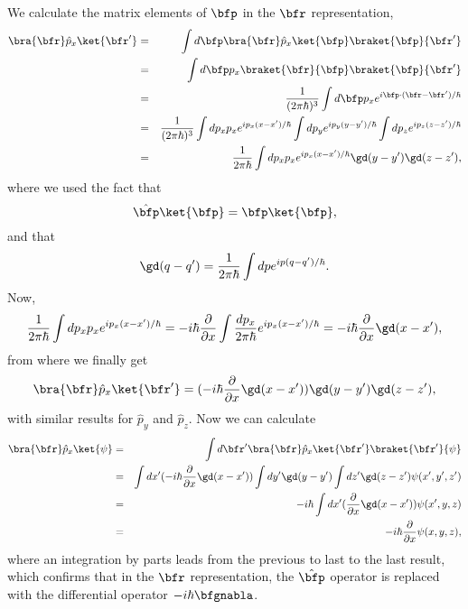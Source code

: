We calculate the matrix elements of $\bfp$ in the $\bfr$
representation,
\begin{eqnarray}\label{ap_matp}
\bra{\bfr}\hat{p}_x\ket{\bfr'}&=&
\int d\bfp
\bra{\bfr}\hat{p}_x\ket{\bfp}\braket{\bfp}{\bfr'} \\ \nonumber
&=&
\int d\bfp
p_x\braket{\bfr}{\bfp}\braket{\bfp}{\bfr'} \\ \nonumber
&=&
\frac{1}{(2\pi\hbar)^3}
\int d\bfp
p_x
e^{i\bfp\cdot(\bfr-\bfr')/\hbar}
\\ \nonumber
&=&
\frac{1}{(2\pi\hbar)^3}
\int dp_x
p_x
e^{ip_x(x-x')/\hbar}
\int dp_y
e^{ip_y(y-y')/\hbar}
\int dp_z
e^{ip_z(z-z')/\hbar}
\\ \nonumber
&=&
\frac{1}{2\pi\hbar}
\int dp_x
p_x
e^{ip_x(x-x')/\hbar}
\gd(y-y')
\gd(z-z')
,
\end{eqnarray}
where we used the fact that
\begin{equation}\label{ap_otra}
\hat\bfp\ket{\bfp}=\bfp\ket{\bfp}
,
\end{equation}
and that
\begin{equation}\label{ap_delta}
\gd(q-q')=\frac{1}{2\pi\hbar}
\int dp
e^{ip(q-q')/\hbar}
.
\end{equation}
Now,
\begin{equation}\label{ap_mas}
\frac{1}{2\pi\hbar}
\int dp_x
p_x
e^{ip_x(x-x')/\hbar}
=
-i\hbar\frac{\partial}{\partial x}
\int
\frac{dp_x}{2\pi\hbar}
e^{ip_x(x-x')/\hbar}
=-i\hbar\frac{\partial}{\partial x}\gd(x-x')
,
\end{equation}
from where we finally get 
\begin{equation}\label{ap_fin}
\bra{\bfr}\hat{p}_x\ket{\bfr'}=
(-i\hbar\frac{\partial}{\partial x}\gd(x-x'))
\gd(y-y')
\gd(z-z')
,
\end{equation}
with similar results for $\hat{p}_y$ and $\hat{p}_z$.
Now we can calculate
\begin{eqnarray}\label{ap_psi}
\bra{\bfr}\hat{p}_x\ket{\psi}&=&
\int d\bfr' \bra{\bfr}\hat{p}_x\ket{\bfr'}\braket{\bfr'}{\psi}
\\ \nonumber
&=&
\int dx' (-i\hbar\frac{\partial}{\partial x}\gd(x-x'))
\int dy' \gd(y-y')
\int dz' \gd(z-z')
\psi(x',y',z')
\\ \nonumber
&=&
-i\hbar
\int dx' (\frac{\partial}{\partial x}\gd(x-x'))
\psi(x',y,z)
\\ \nonumber
&=&
-i\hbar
\frac{\partial}{\partial x}
\psi(x,y,z)
,
\end{eqnarray}
where an integration by parts leads from the previous to last 
to the last result, which confirms that in the $\bfr$ representation,
the $\hat\bfp$ operator is replaced with the differential operator
$-i\hbar\bfgnabla$. 

